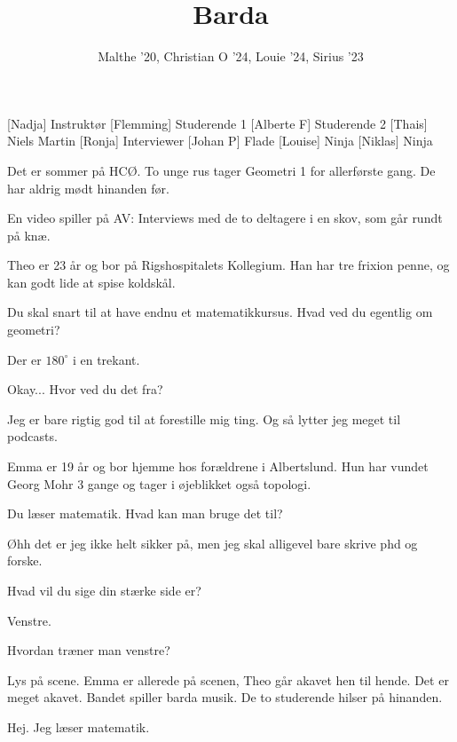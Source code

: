 \documentclass[a4paper, 11pt]{article}
\title{Barda}
\author{Malthe '20, Christian O '24, Louie '24, Sirius '23}
\begin{document}
\maketitle

\begin{roles}  
[Nadja] Instruktør 
[Flemming] Studerende 1
[Alberte F] Studerende 2
[Thais] Niels Martin
[Ronja] Interviewer
[Johan P] Flade
[Louise] Ninja 
[Niklas] Ninja
\end{roles}

\begin{sketch}
    





 Det er sommer på HCØ. To unge rus tager Geometri 1 for allerførste gang. De har aldrig mødt hinanden før. 

\scene En video spiller på AV: Interviews med de to deltagere i en skov, som går rundt på knæ.

 Theo er 23 år og bor på Rigshospitalets Kollegium. Han har tre frixion penne, og kan godt lide at spise koldskål. 

 Du skal snart til at have endnu et matematikkursus. Hvad ved du egentlig om geometri?

 Der er $180^\circ$ i en trekant. 

 Okay... Hvor ved du det fra?

 Jeg er bare rigtig god til at forestille mig ting. Og så lytter jeg meget til podcasts. 

 Emma er 19 år og bor hjemme hos forældrene i Albertslund. Hun har vundet Georg Mohr 3 gange og tager i øjeblikket også topologi. 

 Du læser matematik. Hvad kan man bruge det til?

 Øhh det er jeg ikke helt sikker på, men jeg skal alligevel bare skrive phd og forske.

 Hvad vil du sige din stærke side er?

 Venstre. 

 Hvordan træner man venstre?

\scene Lys på scene. Emma er allerede på scenen, Theo går akavet hen til hende. Det er meget akavet. Bandet spiller barda musik. De to studerende hilser på hinanden.

 Hej. Jeg læser matematik. 


\end{sketch}
\end{document}
